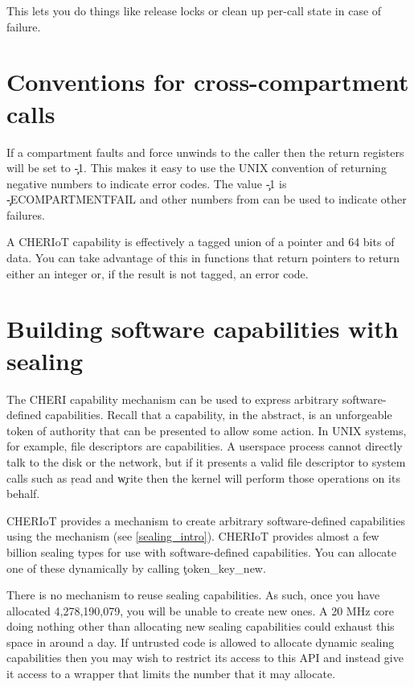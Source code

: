 This lets you do things like release locks or clean up per-call state in case of failure.

\section{Conventions for cross-compartment calls}

If a compartment faults and force unwinds to the caller then the return registers will be set to \c{-1}.
This makes it easy to use the UNIX convention of returning negative numbers to indicate error codes.
The value \c{-1} is \c{-ECOMPARTMENTFAIL} and other numbers from  can be used to indicate other failures.

A CHERIoT capability is effectively a tagged union of a pointer and 64 bits of data.
You can take advantage of this in functions that return pointers to return either an integer or, if the result is not tagged, an error code.


\section[label=software_capabilities]{Building software capabilities with sealing}

The CHERI capability mechanism can be used to express arbitrary software-defined capabilities.
Recall that a capability, in the abstract, is an unforgeable token of authority that can be presented to allow some action.
In UNIX systems, for example, file descriptors are capabilities.
A userspace process cannot directly talk to the disk or the network, but if it presents a valid file descriptor to system calls such as \c{read} and \c{write} then the kernel will perform those operations on its behalf.

CHERIoT provides a mechanism to create arbitrary software-defined capabilities using the  mechanism (see \ref{sealing_intro}).
CHERIoT provides almost a few billion sealing types for use with software-defined capabilities.
You can allocate one of these dynamically by calling \c{token_key_new}.

\begin{caution}
There is no mechanism to reuse sealing capabilities.
As such, once you have allocated 4,278,190,079, you will be unable to create new ones.
A 20 MHz core doing nothing other than allocating new sealing capabilities could exhaust this space in around a day.
If untrusted code is allowed to allocate dynamic sealing capabilities then you may wish to restrict its access to this API and instead give it access to a wrapper that limits the number that it may allocate.
\end{caution}

